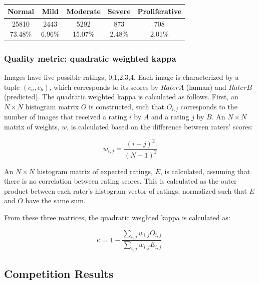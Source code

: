\begin{frame}
\begin{tabular}{|@{}c@{}|@{}c@{}|@{}c@{}|@{}c@{}|@{}c@{}|}
Normal & Mild & Moderate & Severe & Proliferative \\

\hline
 \specialcell{25810\\ \footnotesize{73.48\%}}  & 
 \specialcell{2443\\\footnotesize6.96\%} & 
 \specialcell{5292\\\footnotesize15.07\%} & 
 \specialcell{873\\\footnotesize2.48\%} & 
 \specialcell{708\\\footnotesize2.01\%} \\

\hline
\end{tabular}

\end{frame}

\begin{frame}\frametitle{Quality metric: quadratic weighted kappa} 

\footnotesize { %
Images have five possible ratings, 0,1,2,3,4.  Each image is characterized by a tuple $ (e_a,e_b) $, which corresponds to its scores by $Rater A$ (human) and $Rater B$ (predicted).  The quadratic weighted kappa is calculated as follows. First, an $N\times N$ histogram matrix $O$ is constructed, such that $O_{i,j}$ corresponds to the number of images that received a rating $i$ by $A$ and a rating $j$ by $B$. An $N\times N$ matrix of weights, $w$, is calculated based on the difference between raters' scores:

\[ w_{i,j} = \frac{\left(i-j\right)^2}{\left(N-1\right)^2} \]

An $N\times N$ histogram matrix of expected ratings, $E$, is calculated, assuming that there is no correlation between rating scores.  This is calculated as the outer product between each rater's histogram vector of ratings, normalized such that $E$ and $O$ have the same sum.

From these three matrices, the quadratic weighted kappa is calculated as: 

\[ \kappa=1-\frac{\sum_{i,j}w_{i,j}O_{i,j}}{\sum_{i,j}w_{i,j}E_{i,j}}. \]
}

\end{frame}

\subsection{Competition Results}

